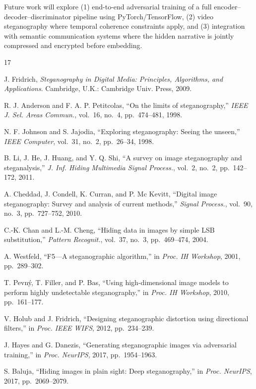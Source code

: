 \documentclass[conference]{IEEEtran}
\begin{document}
Future work will explore (1) end-to-end adversarial training of a full encoder--decoder--discriminator pipeline using PyTorch/TensorFlow, (2) video steganography where temporal coherence constraints apply, and (3) integration with semantic communication systems where the hidden narrative is jointly compressed and encrypted before embedding.

\begin{thebibliography}{17}

 J. Fridrich, \textit{Steganography in Digital Media: Principles, Algorithms, and Applications}. Cambridge, U.K.: Cambridge Univ. Press, 2009.

 R. J. Anderson and F. A. P. Petitcolas, ``On the limits of steganography,'' \textit{IEEE J. Sel. Areas Commun.}, vol.~16, no.~4, pp.~474--481, 1998.

 N. F. Johnson and S. Jajodia, ``Exploring steganography: Seeing the unseen,'' \textit{IEEE Computer}, vol.~31, no.~2, pp.~26--34, 1998.

 B. Li, J. He, J. Huang, and Y. Q. Shi, ``A survey on image steganography and steganalysis,'' \textit{J. Inf. Hiding Multimedia Signal Process.}, vol.~2, no.~2, pp.~142--172, 2011.

 A. Cheddad, J. Condell, K. Curran, and P. Mc Kevitt, ``Digital image steganography: Survey and analysis of current methods,'' \textit{Signal Process.}, vol.~90, no.~3, pp.~727--752, 2010.

 C.-K. Chan and L.-M. Cheng, ``Hiding data in images by simple LSB substitution,'' \textit{Pattern Recognit.}, vol.~37, no.~3, pp.~469--474, 2004.

 A. Westfeld, ``F5---A steganographic algorithm,'' in \textit{Proc. IH Workshop}, 2001, pp.~289--302.

 T. Pevn\'y, T. Filler, and P. Bas, ``Using high-dimensional image models to perform highly undetectable steganography,'' in \textit{Proc. IH Workshop}, 2010, pp.~161--177.

 V. Holub and J. Fridrich, ``Designing steganographic distortion using directional filters,'' in \textit{Proc. IEEE WIFS}, 2012, pp.~234--239.

 J. Hayes and G. Danezis, ``Generating steganographic images via adversarial training,'' in \textit{Proc. NeurIPS}, 2017, pp.~1954--1963.

 S. Baluja, ``Hiding images in plain sight: Deep steganography,'' in \textit{Proc. NeurIPS}, 2017, pp.~2069--2079.


\end{thebibliography}
\end{document}
